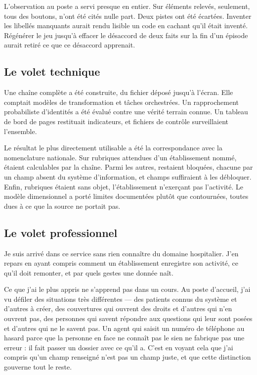 L'observation au poste a servi presque en entier. Sur  éléments relevés,
 seulement, tous des boutons, n'ont été cités nulle part. Deux
pistes ont été écartées. Inventer les libellés manquants aurait rendu lisible un code en cachant
qu'il était inventé. Régénérer le jeu jusqu'à effacer le désaccord de deux faits sur la fin d'un
épisode aurait retiré ce que ce désaccord apprenait.

\subsection*{Le volet technique}

Une chaîne complète a été construite, du fichier déposé jusqu'à l'écran. Elle comptait
 modèles de transformation et  tâches orchestrées. Un
rapprochement probabiliste d'identités a été évalué contre une vérité terrain connue. Un tableau de
bord de  pages restituait  indicateurs, et
 fichiers de contrôle surveillaient l'ensemble.

Le résultat le plus directement utilisable a été la correspondance avec la nomenclature nationale.
Sur  rubriques attendues d'un établissement nommé,
 étaient calculables par la chaîne. Parmi les autres,
 restaient bloquées, chacune par un champ absent du système
d'information, et  champs suffiraient à les débloquer. Enfin,
 rubriques étaient sans objet, l'établissement n'exerçant pas
l'activité. Le modèle dimensionnel a
porté  limites documentées plutôt que contournées, toutes dues à ce que la
source ne portait pas.

\subsection*{Le volet professionnel}

Je suis arrivé dans ce service sans rien connaître du domaine hospitalier. J'en repars en ayant
compris comment un établissement enregistre son activité, ce qu'il doit remonter, et par quels
gestes une donnée naît.

Ce que j'ai le plus appris ne s'apprend pas dans un cours. Au poste d'accueil, j'ai vu défiler des
situations très différentes — des patients connus du système et d'autres à créer, des couvertures
qui ouvrent des droits et d'autres qui n'en ouvrent pas, des personnes qui savent répondre aux
questions qui leur sont posées et d'autres qui ne le savent pas. Un agent qui saisit un numéro de
téléphone au hasard parce que la personne en face ne connaît pas le sien ne fabrique pas une
erreur : il fait passer un dossier avec ce qu'il a. C'est en voyant cela que j'ai compris qu'un
champ renseigné n'est pas un champ juste, et que cette distinction gouverne tout le reste.

